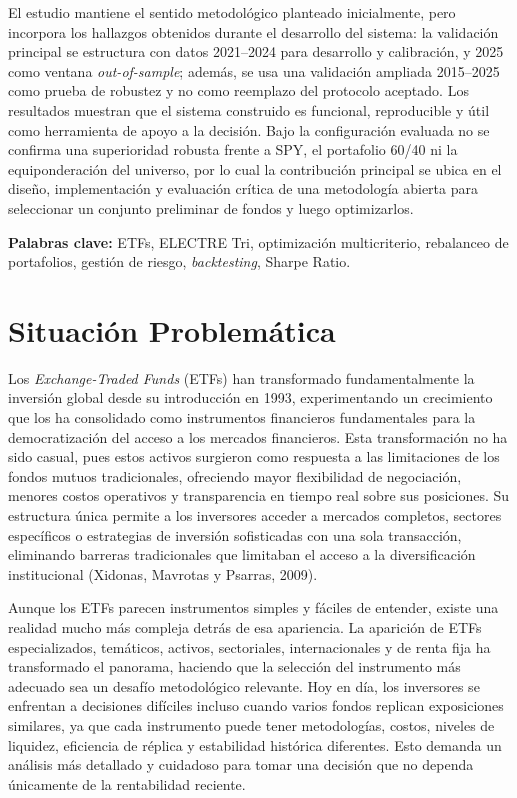 \documentclass[12pt,letterpaper]{article}
\begin{document}
\begin{titlepage}
El estudio mantiene el sentido metodológico planteado inicialmente, pero incorpora los hallazgos obtenidos durante el desarrollo del sistema: la validación principal se estructura con datos 2021--2024 para desarrollo y calibración, y 2025 como ventana \textit{out-of-sample}; además, se usa una validación ampliada 2015--2025 como prueba de robustez y no como reemplazo del protocolo aceptado. Los resultados muestran que el sistema construido es funcional, reproducible y útil como herramienta de apoyo a la decisión. Bajo la configuración evaluada no se confirma una superioridad robusta frente a SPY, el portafolio 60/40 ni la equiponderación del universo, por lo cual la contribución principal se ubica en el diseño, implementación y evaluación crítica de una metodología abierta para seleccionar un conjunto preliminar de fondos y luego optimizarlos.

\textbf{Palabras clave:} ETFs, ELECTRE Tri, optimización multicriterio, rebalanceo de portafolios, gestión de riesgo, \textit{backtesting}, Sharpe Ratio.
\end{titlepage}

\tableofcontents
\newpage
\renewcommand{\listfigurename}{Lista de figuras}
\renewcommand{\listtablename}{Lista de tablas}
\listoffigures
\listoftables
\newpage

\section{Situación Problemática}

Los \textit{Exchange-Traded Funds} (ETFs) han transformado fundamentalmente la inversión global desde su introducción en 1993, experimentando un crecimiento que los ha consolidado como instrumentos financieros fundamentales para la democratización del acceso a los mercados financieros. Esta transformación no ha sido casual, pues estos activos surgieron como respuesta a las limitaciones de los fondos mutuos tradicionales, ofreciendo mayor flexibilidad de negociación, menores costos operativos y transparencia en tiempo real sobre sus posiciones. Su estructura única permite a los inversores acceder a mercados completos, sectores específicos o estrategias de inversión sofisticadas con una sola transacción, eliminando barreras tradicionales que limitaban el acceso a la diversificación institucional (Xidonas, Mavrotas y Psarras, 2009).

Aunque los ETFs parecen instrumentos simples y fáciles de entender, existe una realidad mucho más compleja detrás de esa apariencia. La aparición de ETFs especializados, temáticos, activos, sectoriales, internacionales y de renta fija ha transformado el panorama, haciendo que la selección del instrumento más adecuado sea un desafío metodológico relevante. Hoy en día, los inversores se enfrentan a decisiones difíciles incluso cuando varios fondos replican exposiciones similares, ya que cada instrumento puede tener metodologías, costos, niveles de liquidez, eficiencia de réplica y estabilidad histórica diferentes. Esto demanda un análisis más detallado y cuidadoso para tomar una decisión que no dependa únicamente de la rentabilidad reciente.
\end{document}

